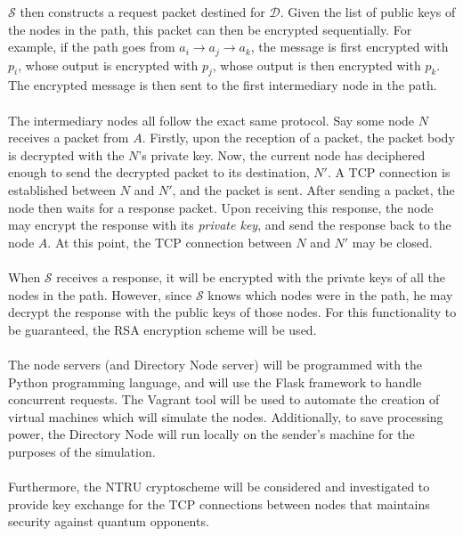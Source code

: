 \documentclass[10pt]{article}
\begin{document}
$\mathcal{S}$ then constructs a request packet destined for $\mathcal{D}$. Given the list of
public keys of the nodes in the path, this packet can then be encrypted
sequentially. For example, if the path goes from $a_i\rightarrow a_j\rightarrow
a_k$, the message is first encrypted with $p_i$, whose output is encrypted with
$p_j$, whose output is then encrypted with $p_k$. The encrypted message
is then sent to the first intermediary node in the path.\\\\
The intermediary nodes all follow the exact same protocol. Say some node $N$
receives a packet from $A$. Firstly, upon the
reception of a packet, the packet body is decrypted with the $N$'s
private key. Now, the current node has deciphered enough to send the decrypted
packet to its destination, $N'$. A TCP connection is established between $N$
and $N'$, and the packet is sent. After sending a packet, the node then waits for a
response packet. Upon receiving this response, the node may encrypt the
response with its \textit{private key}, and send the response back to the node
$A$. At this point, the TCP connection between $N$ and $N'$ may be closed.\\\\
When $\mathcal{S}$ receives a response, it will be encrypted with the private keys of
all the nodes in the path. However, since $\mathcal{S}$ knows which nodes were in the
path, he may decrypt the response with the public keys of those nodes. For this
functionality to be guaranteed, the RSA encryption scheme will be used.\\\\
The node servers (and Directory Node server) will be programmed with the Python
programming language, and will use the Flask framework to handle concurrent
requests. The Vagrant tool will be used to automate the creation of virtual
machines which will simulate the nodes. Additionally, to save processing power,
the Directory Node will run locally on the sender's machine for the purposes of
the simulation.\\\\
Furthermore, the NTRU cryptoscheme will be considered and investigated to
provide key exchange for the TCP connections between nodes that maintains
security against quantum opponents.
\end{document}
